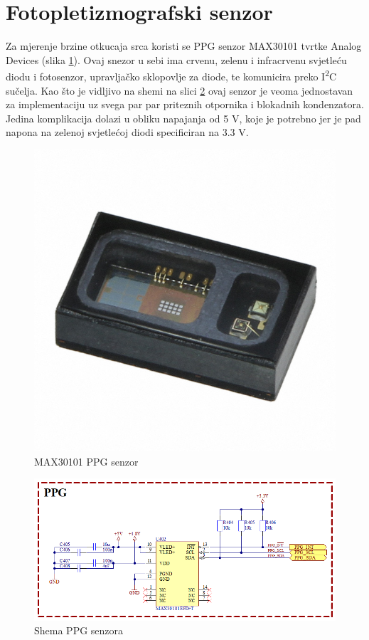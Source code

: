 \newpage
\section{Fotopletizmografski senzor}

Za mjerenje brzine otkucaja srca koristi se PPG senzor MAX30101 tvrtke Analog Devices (slika \ref{slk:MAX30101}). Ovaj snezor u sebi ima crvenu, zelenu i infracrvenu svjetleću diodu i fotosenzor, upravljačko sklopovlje za diode, te komunicira preko I\textsuperscript{2}C sučelja. Kao što je vidljivo na shemi na slici \ref{slk:PPG} ovaj senzor je veoma jednostavan za implementaciju uz svega par par priteznih otpornika i blokadnih kondenzatora. Jedina komplikacija dolazi u obliku napajanja od 5 V, koje je potrebno jer je pad napona na zelenoj svjetlećoj diodi specificiran na 3.3 V.
\begin{figure}[htb]
    \centering
    \includegraphics[width=6 cm]{Figures/MAX30101.JPG}
    \caption{MAX30101 PPG senzor}
    \label{slk:MAX30101}
\end{figure}
\begin{figure}[htb]
    \centering
    \includegraphics[width=\textwidth]{Figures/PPG.png}
    \caption{Shema PPG senzora}
    \label{slk:PPG}
\end{figure}

